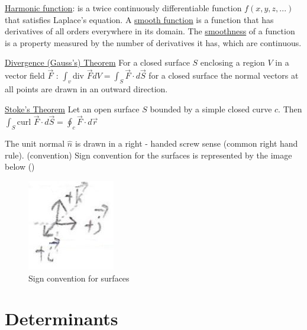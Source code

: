 \documentclass[12pt]{article}
\def\div{\text{div\ }} %
\def\curl{\text{curl\ }} %
\begin{document}
\begin{flushleft}
	\textbullet \quad \uline{Harmonic function}: is a twice continuously differentiable function $f(x,y,z,...)$ that satisfies Laplace's equation. \linebreak 
	\textbullet \quad A \uline{smooth function} is a function that has derivatives of all orders everywhere in its domain. The \uline{smoothness} of a function is a property measured by the number of derivatives it has, which are continuous. \linebreak 		
	
	\textbullet \quad \uline{Divergence (Gauss's) Theorem} \linebreak 
	For a closed surface $S$ enclosing a region $V$ in a vector field $\vec{F}$  :  $\displaystyle \int_v \div \vec{F} dV = \int_S \vec{F} \cdot d \vec{S} $ \linebreak 
	for a closed surface the normal vectors at all points are drawn in an outward direction. \linebreak 
	
	\textbullet \quad \uline{Stoke's Theorem} \linebreak 
	Let an open surface $S$ bounded by a simple closed curve $c$. Then $\displaystyle \int_S \curl \vec{F} \cdot d \vec{S} = \oint_c \vec{F} \cdot d \vec{r} $ \linebreak 
	
	\textbullet \quad The unit normal $\hat{n}$ is drawn in a right - handed screw sense (common right hand rule). (convention) \linebreak 
	\textbullet \quad Sign convention for the surfaces is represented by the image below () \linebreak 
	
	\begin{figure}[H]
	\centering
	\includegraphics[scale=2.5]{surfaceConvention}
	\caption{Sign convention for surfaces}
	\label{fig:surfaceConvention}
	\end{figure}
	
	
	\pagebreak
	
	
	\section{Determinants}
	

\end{flushleft}
\end{document}
